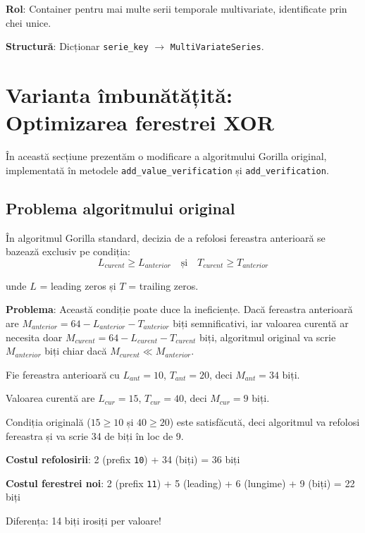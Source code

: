 \textbf{Rol}: Container pentru mai multe serii temporale multivariate, identificate prin chei unice.

\textbf{Structură}: Dicționar \texttt{serie\_key} $\rightarrow$ \texttt{MultiVariateSeries}.

\section{Varianta îmbunătățită: Optimizarea ferestrei XOR}

În această secțiune prezentăm o modificare a algoritmului Gorilla original, implementată în metodele \texttt{add\_value\_verification} și \texttt{add\_verification}.

\subsection{Problema algoritmului original}

În algoritmul Gorilla standard, decizia de a refolosi fereastra anterioară se bazează exclusiv pe condiția:
\begin{equation}
    L_{curent} \geq L_{anterior} \quad \text{și} \quad T_{curent} \geq T_{anterior}
\end{equation}

unde $L$ = leading zeros și $T$ = trailing zeros.

\textbf{Problema}: Această condiție poate duce la ineficiențe. Dacă fereastra anterioară are $M_{anterior} = 64 - L_{anterior} - T_{anterior}$ biți semnificativi, iar valoarea curentă ar necesita doar $M_{curent} = 64 - L_{curent} - T_{curent}$ biți, algoritmul original va scrie $M_{anterior}$ biți chiar dacă $M_{curent} \ll M_{anterior}$.

\begin{example}
Fie fereastra anterioară cu $L_{ant} = 10$, $T_{ant} = 20$, deci $M_{ant} = 34$ biți.

Valoarea curentă are $L_{cur} = 15$, $T_{cur} = 40$, deci $M_{cur} = 9$ biți.

Condiția originală ($15 \geq 10$ și $40 \geq 20$) este satisfăcută, deci algoritmul va refolosi fereastra și va scrie 34 de biți în loc de 9.

\textbf{Costul refolosirii}: 2 (prefix \texttt{10}) + 34 (biți) = 36 biți

\textbf{Costul ferestrei noi}: 2 (prefix \texttt{11}) + 5 (leading) + 6 (lungime) + 9 (biți) = 22 biți

Diferența: 14 biți irosiți per valoare!
\end{example}

